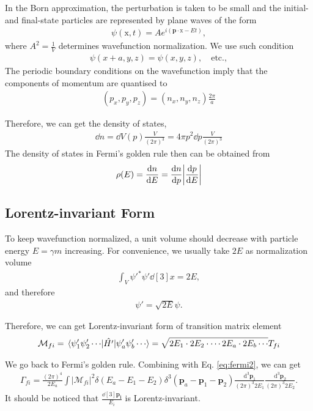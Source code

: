 In the Born approximation, the perturbation is taken to be small and the initial- and final-state particles are represented by plane waves of the form
\begin{align}
    \psi(\mathrm{x},t)=Ae^{i(\mathbf{p}\cdot \mathrm{x}-Et)},
\end{align}
where $A^{2}=\frac{1}{V}$ determines wavefunction normalization. We use such condition
\begin{align}
    \psi(x+a,y,z)=\psi(x,y,z),\quad \text{etc.},
\end{align}
The periodic boundary conditions on the wavefunction imply that the components of momentum are quantised to
\begin{align}
    (p_{x},p_{y},p_{z})=(n_{x},n_{y},n_{z})\frac{2\pi}{a}
\end{align}

Therefore, we can get the density of states,
\begin{align}
    \dd{n}=\dd{V(p)}\frac{V}{(2\pi)^{3}}=4\pi p^{2}\dd{p}\frac{V}{(2\pi)^{3}}
\end{align}
The density of states in Fermi’s golden rule then can be obtained from
\begin{align}
    \rho(E)=\frac{\dd{n}}{\dd{E}}=\frac{\dd{n}}{\dd{p}}\abs{\frac{\dd{p}}{\dd{E}}}
\end{align}

\subsection{Lorentz-invariant Form}

To keep wavefunction normalized, a unit volume should decrease with particle energy $E=\gamma m$ increasing. For convenience, we usually take $2E$ as normalization volume
\begin{align}
    \int_{V}\psi'^{*}\psi'\dd[3]{x}=2E,
\end{align}
and therefore
\begin{align}
    \psi'=\sqrt{2E}\psi.
\end{align}

Therefore, we can get Lorentz-invariant form of transition matrix element
\begin{align}
    \mathcal{M}_{fi}=\matrixel{\psi'_{1}\psi'_{2}\cdots }{\hat{H'}}{\psi'_{a}\psi'_{b}\cdots }=\sqrt{2E_{1}\cdot 2E_{2}\cdot \cdots 2E_{a}\cdot 2E_{b}\cdots }T_{fi}
\end{align}

We go back to Fermi's golden rule. Combining with Eq. \ref{eq:fermi2}, we can get 
\begin{align}
    \Gamma_{f i}=\frac{(2 \pi)^4}{2 E_a} \int\left|\mathcal{M}_{f i}\right|^2 \delta\left(E_a-E_1-E_2\right) \delta^3\left(\mathbf{p}_a-\mathbf{p}_1-\mathbf{p}_2\right) \frac{\mathrm{d}^3 \mathbf{p}_1}{(2 \pi)^3 2 E_1} \frac{\mathrm{d}^3 \mathbf{p}_2}{(2 \pi)^3 2 E_2}.
\end{align}
It should be noticed that $\frac{\dd[3]{\mathbf{p_{i}}}}{E_{i}}$ is Lorentz-invariant.

